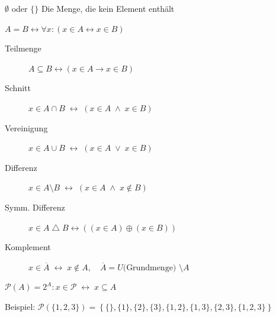 \documentclass[a4paper]{article}
\begin{document}
\begin{multicols}{2}
	\begin{fdef}
	$\emptyset$ oder $\{ \}$ \hspace{4mm} Die Menge, die kein Element enthält
	\end{fdef}

	\begin{fsatz}
		$A = B \longleftrightarrow \forall x : (x \in A \leftrightarrow x \in B)$
	\end{fsatz}
\end{multicols}

	\begin{fregeln}[Mengenbildung]
		\vspace{-3mm}
		\begin{multicols}{2}
		\begin{description}
			\item[Teilmenge] $A \subseteq B \leftrightarrow (x\in A \rightarrow x\in B)$
			\vspace{-2.5mm}
			\item[Schnitt] $x \in A \cap B \; \leftrightarrow \; (x \in A \; \wedge \; x \in B)$
			\vspace{-2.5mm}
			\item[Vereinigung] $x \in A \cup B \; \leftrightarrow \; (x \in A \; \vee \; x \in B)$
			\item[Differenz] $x \in A \setminus B \; \leftrightarrow \; (x \in A \; \wedge \; x \not \in B)$
			\vspace{-2.5mm}
			\item[Symm. Differenz] $x \in A \bigtriangleup B \leftrightarrow ((x\in A) \oplus (x\in B))$
			\vspace{-2.5mm}
			\item[Komplement] $x \in \overline{A} \; \leftrightarrow \; x \not \in A, \quad \overline{A} = U \text{(Grundmenge) } \setminus A$
		\end{description}
		\end{multicols}
		\vspace{-3mm}
	\end{fregeln}

	\begin{fdef}[Potenzmenge (= Menge aller Teilmengen einer gegebenen Menge)]
		$\mathcal{P} (A) = 2^A: x \in \mathcal{P} \; \leftrightarrow \; x \subseteq A$
	\end{fdef}
		\vspace{-2mm}
		Beispiel: $\mathcal{P} (\{1,2,3\}) = \left\{ \{\}, \{1\}, \{2\}, \{3\}, \{1, 2\}, \{1, 3\}, \{2, 3\}, \{1, 2, 3\} \right\}$
\end{document}
